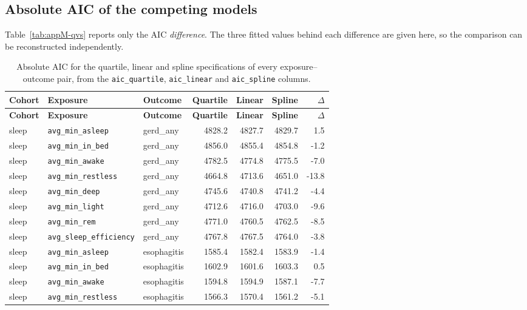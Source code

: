 \documentclass[11pt]{article}
\newcommand{\code}[1]{\texttt{\small #1}}
\begin{document}
\subsection{Absolute AIC of the competing models}
Table~\ref{tab:appM-qvs} reports only the AIC \emph{difference}. The three fitted values behind
each difference are given here, so the comparison can be reconstructed independently.
\footnotesize\begin{longtable}{@{}p{1.6cm}p{3.2cm}p{2.0cm}rrrr@{}}
\caption{Absolute AIC for the quartile, linear and spline specifications of every exposure--outcome pair, from the \code{aic\_quartile}, \code{aic\_linear} and \code{aic\_spline} columns.}\label{tab:appM-aicabs}\\
\toprule \textbf{Cohort} & \textbf{Exposure} & \textbf{Outcome} & \textbf{Quartile} & \textbf{Linear} & \textbf{Spline} & \textbf{$\Delta$} \\ \midrule \endfirsthead
\toprule \textbf{Cohort} & \textbf{Exposure} & \textbf{Outcome} & \textbf{Quartile} & \textbf{Linear} & \textbf{Spline} & \textbf{$\Delta$} \\ \midrule \endhead
sleep & \code{avg\_min\_asleep} & gerd\_any & 4828.2 & 4827.7 & 4829.7 & 1.5 \\
sleep & \code{avg\_min\_in\_bed} & gerd\_any & 4856.0 & 4855.4 & 4854.8 & -1.2 \\
sleep & \code{avg\_min\_awake} & gerd\_any & 4782.5 & 4774.8 & 4775.5 & -7.0 \\
sleep & \code{avg\_min\_restless} & gerd\_any & 4664.8 & 4713.6 & 4651.0 & -13.8 \\
sleep & \code{avg\_min\_deep} & gerd\_any & 4745.6 & 4740.8 & 4741.2 & -4.4 \\
sleep & \code{avg\_min\_light} & gerd\_any & 4712.6 & 4716.0 & 4703.0 & -9.6 \\
sleep & \code{avg\_min\_rem} & gerd\_any & 4771.0 & 4760.5 & 4762.5 & -8.5 \\
sleep & \code{avg\_sleep\_efficiency} & gerd\_any & 4767.8 & 4767.5 & 4764.0 & -3.8 \\
sleep & \code{avg\_min\_asleep} & esophagitis & 1585.4 & 1582.4 & 1583.9 & -1.4 \\
sleep & \code{avg\_min\_in\_bed} & esophagitis & 1602.9 & 1601.6 & 1603.3 & 0.5 \\
sleep & \code{avg\_min\_awake} & esophagitis & 1594.8 & 1594.9 & 1587.1 & -7.7 \\
sleep & \code{avg\_min\_restless} & esophagitis & 1566.3 & 1570.4 & 1561.2 & -5.1 \\

\end{longtable}
\end{document}
